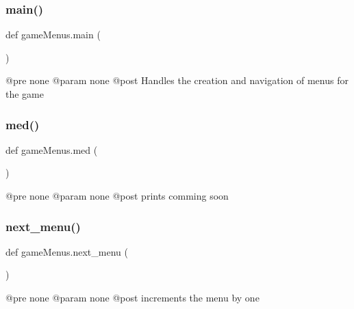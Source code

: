 \subsubsection{\texorpdfstring{main()}{main()}}
{\footnotesize\ttfamily def game\+Menus.\+main (\begin{DoxyParamCaption}{ }\end{DoxyParamCaption})}

\begin{DoxyVerb}@pre none
@param none
@post Handles the creation and navigation of menus for the game
\end{DoxyVerb}
 \mbox{\label{namespacegame_menus_a8ca037940ec4a6f5c27ca4e93d7b9356}} 
\subsubsection{\texorpdfstring{med()}{med()}}
{\footnotesize\ttfamily def game\+Menus.\+med (\begin{DoxyParamCaption}{ }\end{DoxyParamCaption})}

\begin{DoxyVerb}@pre none
@param none
@post prints comming soon
\end{DoxyVerb}
 \mbox{\label{namespacegame_menus_af87fbd020405958cc021f902765a7e0d}} 
\subsubsection{\texorpdfstring{next\+\_\+menu()}{next\_menu()}}
{\footnotesize\ttfamily def game\+Menus.\+next\+\_\+menu (\begin{DoxyParamCaption}{ }\end{DoxyParamCaption})}

\begin{DoxyVerb}@pre none
@param none
@post increments the menu by one
\end{DoxyVerb}
 \mbox{\label{namespacegame_menus_af6914228389df9b4614e93c7c6836b67}} 
